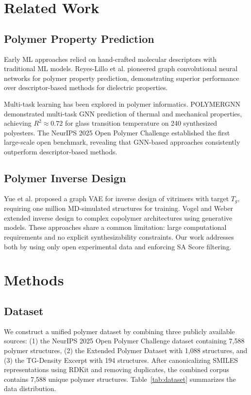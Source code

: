 \documentclass{article}
\begin{document}
\section{Related Work}

\subsection{Polymer Property Prediction}

Early ML approaches relied on hand-crafted molecular descriptors with traditional
ML models. Reyes-Lillo et al. \citep{gcnn_polymer_2018} pioneered graph convolutional neural networks
for polymer property prediction, demonstrating superior performance over
descriptor-based methods for dielectric properties.

Multi-task learning has been explored in polymer informatics.
POLYMERGNN \citep{polymergnn_2023} demonstrated multi-task GNN prediction
of thermal and mechanical properties, achieving $R^2 \approx 0.72$ for glass
transition temperature on 240 synthesized polyesters.
The NeurIPS 2025 Open Polymer Challenge \citep{neurips_opc_2025} established
the first large-scale open benchmark, revealing that GNN-based approaches
consistently outperform descriptor-based methods.

\subsection{Polymer Inverse Design}

Yue et al. \citep{vitrimer_inverse_2023} proposed a graph VAE for inverse design of vitrimers
with target $T_g$, requiring one million MD-simulated structures for training.
Vogel and Weber \citep{copolymer_inverse_2024} extended inverse design to complex copolymer
architectures using generative models.
These approaches share a common limitation: large computational requirements
and no explicit synthesizability constraints. Our work addresses both by using
only open experimental data and enforcing SA Score filtering.

\section{Methods}

\subsection{Dataset}

We construct a unified polymer dataset by combining three publicly available sources:
(1) the NeurIPS 2025 Open Polymer Challenge dataset \citep{neurips_opc_2025} containing
7,588 polymer structures, (2) the Extended Polymer Dataset with 1,088 structures,
and (3) the TG-Density Excerpt with 194 structures. After canonicalizing SMILES
representations using RDKit and removing duplicates, the combined corpus contains
7,588 unique polymer structures. Table~\ref{tab:dataset} summarizes the data distribution.
\end{document}

